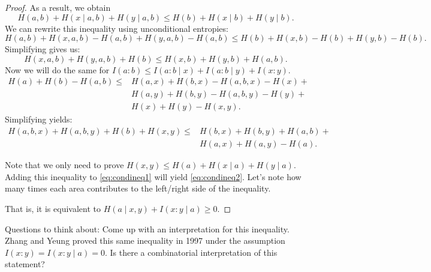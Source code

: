 \documentclass[12pt,sans]{article}
\theoremstyle{definition}
\theoremstyle{plain}
\theoremstyle{remark}
\begin{document}
\begin{proof}
    As a result, we obtain
    \[
        H(a, b) + H(x \mid a, b) + H(y \mid a, b) \le H(b) + H(x \mid b) + H(y \mid b).
    \]
    We can rewrite this inequality using unconditional entropies:
    \[
        H(a, b) + H(x, a, b) - H(a, b) + H(y, a, b) - H(a, b) \le H(b) + H(x, b) - H(b) + H(y, b) - H(b).
    \]
    Simplifying gives us:
    \begin{equation}\label{eq:condineq1}
        H(x, a, b) + H(y, a, b) + H(b) \le H(x, b) + H(y, b) + H(a, b).
    \end{equation}
    Now we will do the same for \(I(a:b) \le I(a:b \mid x) + I(a:b \mid y) + I(x:y)\).
    \begin{equation*}
        \begin{array}{ll}
        H(a) + H(b) - H(a, b) \le
        & H(a, x) + H(b, x) - H(a, b, x) - H(x) + \mbox{} \\
        & H(a, y) + H(b, y) - H(a, b, y) - H(y) + \mbox{} \\
        & H(x) + H(y) - H(x, y).
        \end{array}
    \end{equation*}
    Simplifying yields:
    \begin{equation}\label{eq:condineq2}
        \begin{array}{ll}
        H(a, b, x) + H(a, b, y) + H(b) + H(x, y) \le
        & H(b, x) + H(b, y) + H(a, b) + \mbox{} \\
        & H(a, x) + H(a, y) - H(a).
        \end{array}
    \end{equation}

    Note that we only need to prove \(H(x, y) \le H(a) + H(x \mid a) + H(y \mid a)\).
    Adding this inequality to \eqref{eq:condineq1} will yield \eqref{eq:condineq2}.
    Let’s note how many times each area contributes to the left/right side of the inequality.
    \begin{center}
    \end{center}
    That is, it is equivalent to \(H(a \mid x, y) + I(x:y \mid a) \ge 0\).
\end{proof}
Questions to think about: Come up with an interpretation for this inequality. Zhang and Yeung proved this same inequality in 1997 under the assumption \(I(x:y) = I(x:y \mid a) = 0\). Is there a combinatorial interpretation of this statement?
\end{document}

